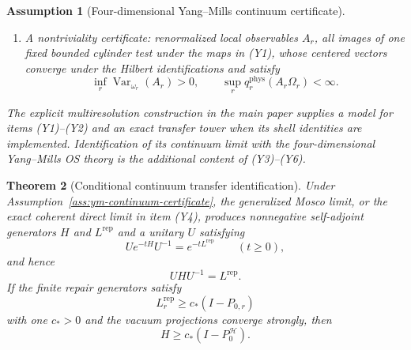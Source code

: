 \documentclass[11pt]{article}
\numberwithin{equation}{section}
\newtheorem{theorem}{Theorem}[section]
\newtheorem{assumption}[theorem]{Assumption}
\theoremstyle{remark}
\newcommand{\Rep}{\mathrm{rep}}
\newcommand{\Hcal}{\mathcal H}
\begin{document}
\begin{assumption}[Four-dimensional Yang--Mills continuum certificate]
\begin{enumerate}[label=\textup{(Y\arabic*)},leftmargin=2em]
physical vacuum projection is
\(P_0^{\Hcal}:=U^{-1}P_0^KU=|\Omega\rangle\langle\Omega|\).
On the dense time-zero cylinder core, the finite Markov/OS identity
\[
\omega_r^{(4)}\!\left(
(\iota_{0,r}f)^*\tau_t^{(r)}(\iota_{0,r}g)
\right)
=\langle f,e^{-tL_r^{\Rep}}g\rangle_{K_r}
=\langle U_r^{-1}f,e^{-tH_r}U_r^{-1}g\rangle_{\Hcal_r}
\]
holds and passes to the limit. Thus the OS-reconstructed time-zero Hilbert space and Hamiltonian
are the same \((\Hcal,H)\) as the transfer-form limit, not a second pair with reused notation.
\item A nontriviality certificate: renormalized local observables \(A_r\), all images of one fixed
bounded cylinder test under the maps in (Y1), whose centered vectors converge under the Hilbert
identifications and satisfy
\[
\inf_r\operatorname{Var}_{\omega_r}(A_r)>0,\qquad
\sup_r q_r^{\mathrm{phys}}(A_r\Omega_r)<\infty .
\]
\end{enumerate}
The explicit multiresolution construction in the main paper supplies a model for items
(Y1)--(Y2) and an exact transfer tower when its shell identities are implemented. Identification
of its continuum limit with the four-dimensional Yang--Mills OS theory is the additional content
of (Y3)--(Y6).
\end{assumption}

\begin{theorem}[Conditional continuum transfer identification]
\label{thm:continuum}
Under Assumption~\ref{ass:ym-continuum-certificate}, the generalized Mosco limit, or the exact
coherent direct limit in item (Y4), produces nonnegative self-adjoint generators \(H\) and
\(L^{\mathrm{rep}}\) and a unitary \(U\) satisfying
\[
U e^{-tH}U^{-1}=e^{-tL^{\mathrm{rep}}}
\qquad(t\ge0),
\tag{8}
\]
and hence
\[
UHU^{-1}=L^{\mathrm{rep}}.
\tag{9}
\]
If the finite repair generators satisfy
\[
L_r^{\Rep}\ge c_*(I-P_{0,r})
\]
with one \(c_*>0\) and the vacuum projections converge strongly, then
\[
H\ge c_*(I-P_0^{\Hcal}).
\]
\end{theorem}
\end{document}
